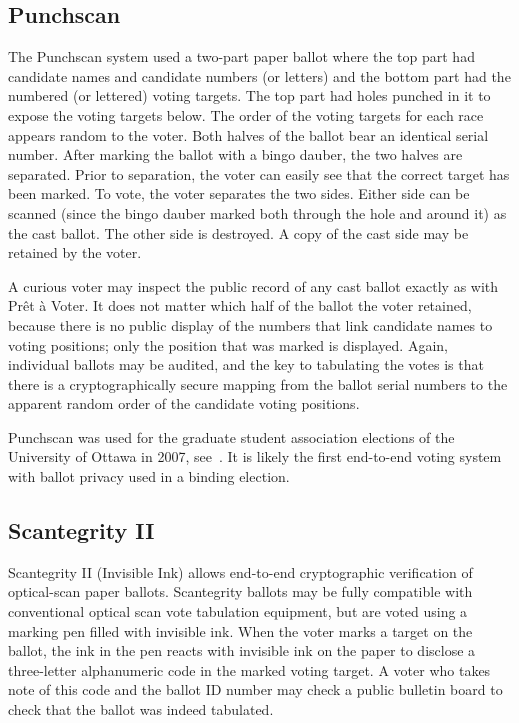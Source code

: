 \subsection{Punchscan~\cite{popoveniuc2006,popoveniuc2010}}

The Punchscan system used a two-part paper ballot where the top part had
candidate names and candidate numbers (or letters) and the bottom part had
the numbered (or lettered) voting targets.  The top part had holes punched
in it to expose the voting targets below.  The order of the voting targets
for each race appears random to the voter.  Both halves of the ballot bear
an identical serial number.  After marking the ballot with a bingo dauber,
the two halves are separated.  Prior to separation, the voter can easily see
that the correct target has been marked.  To vote, the voter separates the
two sides.  Either side can be scanned (since the bingo dauber marked both
through the hole and around it) as the cast ballot. The other side is
destroyed. A copy of the cast side may be retained by the voter.

A curious voter may inspect the public record of any cast ballot exactly as
with Prêt à Voter. It does not matter which half of the ballot the voter
retained, because there is no public display of the numbers that link
candidate names to voting positions; only the position that was marked is
displayed.  Again, individual ballots may be audited, and the key to
tabulating the votes is that there is a cryptographically secure mapping
from the ballot serial numbers to the apparent random order of the candidate
voting positions.

Punchscan was used for the graduate student association elections of the
University of Ottawa in 2007, see~\cite{essex2007}. It is likely the first
end-to-end voting system with ballot privacy used in a binding election.

\subsection{Scantegrity II~\cite{chaum2008,chaum2009}}

Scantegrity II (Invisible Ink) allows end-to-end cryptographic verification
of optical-scan paper ballots.  Scantegrity ballots may be fully compatible
with conventional optical scan vote tabulation equipment, but are voted
using a marking pen filled with invisible ink.  When the voter marks a
target on the ballot, the ink in the pen reacts with invisible ink on the
paper to disclose a three-letter alphanumeric code in the marked voting
target.  A voter who takes note of this code and the ballot ID number may
check a public bulletin board to check that the ballot was indeed tabulated.

